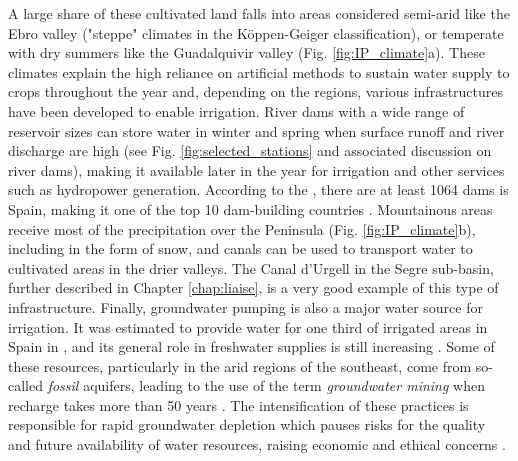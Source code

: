 A large share of these cultivated land falls into areas considered semi-arid like the Ebro valley ("steppe" climates in the Köppen-Geiger classification), or temperate with dry summers like the Guadalquivir valley (Fig. \ref{fig:IP_climate}a). These climates explain the high reliance on artificial methods to sustain water supply to crops throughout the year and, depending on the regions, various infrastructures have been developed to enable irrigation. 
River dams with a wide range of reservoir sizes can store water in winter and spring when surface runoff and river discharge are high (see Fig. \ref{fig:selected_stations} and associated discussion on river dams), making it available later in the year for irrigation and other services such as hydropower generation.
According to the \citet{ICOLD2020}, there are at least 1064 dams is Spain, making it one of the top 10 dam-building countries \citep{sadki_implementation_2023}.
Mountainous areas receive most of the precipitation over the Peninsula (Fig. \ref{fig:IP_climate}b), including in the form of snow, and canals can be used to transport water to cultivated areas in the drier valleys. The Canal d'Urgell \citep{farran_urgell_2024} in the Segre sub-basin, further described in Chapter \ref{chap:liaise}, is a very good example of this type of infrastructure.
Finally, groundwater pumping is also a major water source for irrigation. It was estimated to provide water for one third of irrigated areas in Spain in \citet{de_stefano_groundwater_2015}, and its general role in freshwater supplies is still increasing \citep{llamas_groundwater_2015}. Some of these resources, particularly in the arid regions of the southeast, come from so-called \textit{fossil} aquifers, leading to the use of the term \textit{groundwater mining} when recharge takes more than 50 years \citep{custodio_groundwater_2016}.
The intensification of these practices is responsible for rapid groundwater depletion which pauses risks for the quality and future availability of water resources, raising economic and ethical concerns \citep{custodio_groundwater_2017}.


